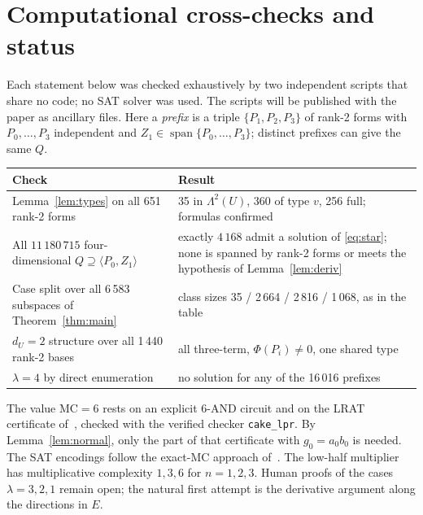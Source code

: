 \documentclass[11pt,a4paper]{article}
\theoremstyle{plain}
\theoremstyle{definition}
\theoremstyle{remark}
\newcommand{\Span}{\operatorname{span}}
\newcommand{\Lam}{\Lambda^{2}}
\newcommand{\dU}{d_U}
\newcommand{\Dir}{E}
\begin{document}
\section{Computational cross-checks and status}

Each statement below was checked exhaustively by two independent scripts that share no code; no SAT solver was used. The scripts will be published with the paper as ancillary files. Here a \emph{prefix} is a triple $\{P_1,P_2,P_3\}$ of rank-2 forms with $P_0,\dots,P_3$ independent and $Z_1\in\Span\{P_0,\dots,P_3\}$; distinct prefixes can give the same $Q$.

\begin{center}
\begin{tabularx}{0.95\textwidth}{@{}X X@{}}
\toprule
Check & Result \\
\midrule
Lemma~\ref{lem:types} on all 651 rank-2 forms & 35 in $\Lam(U)$, 360 of type $v$, 256 full; formulas confirmed\\
All $11\,180\,715$ four-dimensional $Q\supseteq\langle P_0,Z_1\rangle$ & exactly $4\,168$ admit a solution of \eqref{eq:star}; none is spanned by rank-2 forms or meets the hypothesis of Lemma~\ref{lem:deriv}\\
Case split over all 6\,583 subspaces of Theorem~\ref{thm:main} & class sizes 35 / 2\,664 / 2\,816 / 1\,068, as in the table\\
$\dU=2$ structure over all 1\,440 rank-2 bases & all three-term, $\Phi(P_i)\ne0$, one shared type\\
$\lambda=4$ by direct enumeration & no solution for any of the 16\,016 prefixes\\
\bottomrule
\end{tabularx}
\end{center}

The value $\mathrm{MC}=6$ rests on an explicit 6-AND circuit and on the LRAT certificate of~\cite{cert}, checked with the verified checker \texttt{cake\_lpr}. By Lemma~\ref{lem:normal}, only the part of that certificate with $g_0=a_0b_0$ is needed. The SAT encodings follow the exact-MC approach of~\cite{soeken}. The low-half multiplier has multiplicative complexity $1,3,6$ for $n=1,2,3$. Human proofs of the cases $\lambda=3,2,1$ remain open; the natural first attempt is the derivative argument along the directions in $\Dir$.
\end{document}
